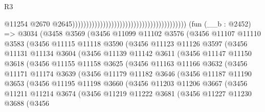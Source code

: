 \begin{lexlean}{R3}
\begin{coremodule}
                                                                                      @11254
                                                                                      @2670
                                                                                      @2645)))))))))))))))))))))))))))))))))))))))))
    (fun (__b : @2452) =>
    @3034
      (@3458
        @3569
        (@3456
          @11099
          @11102
          @3576
          (@3456
            @11107
            @11110
            @3583
            (@3456
              @11115
              @11118
              @3590
              (@3456
                @11123
                @11126
                @3597
                (@3456
                  @11131
                  @11134
                  @3604
                  (@3456
                    @11139
                    @11142
                    @3611
                    (@3456
                      @11147
                      @11150
                      @3618
                      (@3456
                        @11155
                        @11158
                        @3625
                        (@3456
                          @11163
                          @11166
                          @3632
                          (@3456
                            @11171
                            @11174
                            @3639
                            (@3456
                              @11179
                              @11182
                              @3646
                              (@3456
                                @11187
                                @11190
                                @3653
                                (@3456
                                  @11195
                                  @11198
                                  @3660
                                  (@3456
                                    @11203
                                    @11206
                                    @3667
                                    (@3456
                                      @11211
                                      @11214
                                      @3674
                                      (@3456
                                        @11219
                                        @11222
                                        @3681
                                        (@3456
                                          @11227
                                          @11230
                                          @3688
                                          (@3456

\end{coremodule}
\end{lexlean}
